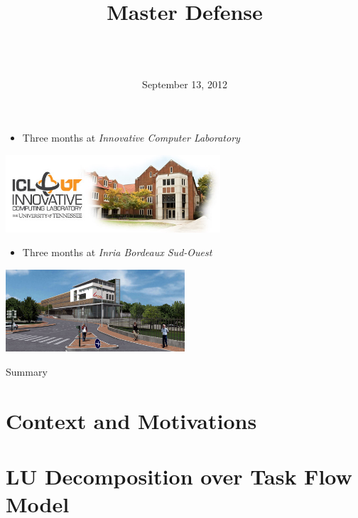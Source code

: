 \documentclass{beamer}
\title[Enabling Partial Pivoting in Task Flow LU Factorization]{
        {\bfseries \projet\\} 
        {\bfseries \huge \sujet}
        {\small Master Defense}
}
\date{September 13, 2012}
\author[Zenati]{
  {\normalsize \bfseries \sffamily} {\large \gA}\\
  \vspace{1cm}
  {\normalsize \bfseries \sffamily} {\large \gB}\\
}
\begin{document}
\begin{frame}
\maketitle
\end{frame}

\begin{frame}
\begin{itemize}
\item Three months at \textit{Innovative Computer Laboratory}
\end{itemize}
\begin{center}
\includegraphics[width=0.6\textwidth]{icl-claxton.jpg}
\end{center}
\begin{itemize}
\item Three months at \textit{Inria Bordeaux Sud-Ouest}
\end{itemize}
\begin{center}
\includegraphics[width=0.5\textwidth]{bandeau-home-bordeaux.jpg}
\end{center}
\end{frame}

\begin{frame}{Summary}
\tableofcontents
\end{frame}

\section[Context]{Context and Motivations}


\section[Task Flow LU]{LU Decomposition over Task Flow Model}

\end{document}
